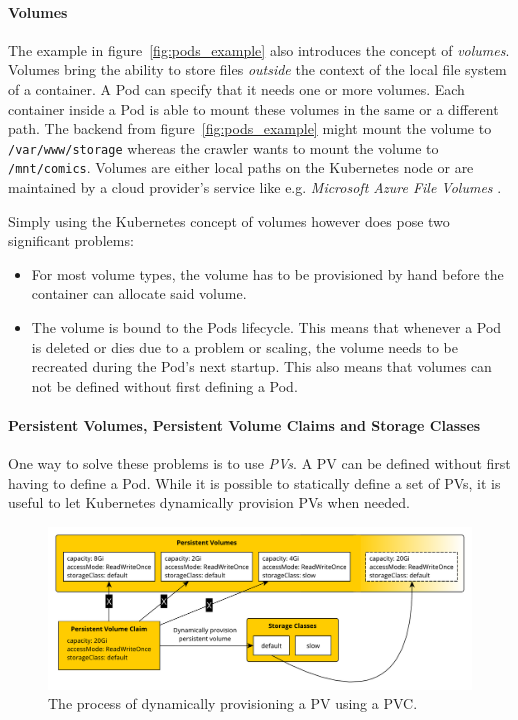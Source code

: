 \paragraph{Volumes}%
\label{par:Volumes}

The example in figure~\ref{fig:pods_example} also introduces the concept of
\textit{volumes}. Volumes bring the ability to store files \textit{outside} the
context of the local file system of a container. A Pod can specify that it
needs one or more volumes. Each container inside a Pod is able to mount these
volumes in the same or a different path. The backend from
figure~\ref{fig:pods_example} might mount the volume to
\texttt{/var/www/storage} whereas the crawler wants to mount the volume to
\texttt{/mnt/comics}. Volumes are either local paths on the Kubernetes node or
are maintained by a cloud provider's service like e.g. \textit{Microsoft Azure
File Volumes} \autocite[Ch. 6]{LuksaKubernetesAction2017}.

Simply using the Kubernetes concept of volumes however does pose two significant problems:
\begin{itemize}
  \item For most volume types, the volume has to be provisioned by hand before
    the container can allocate said volume.
  \item The volume is bound to the Pods lifecycle. This means that whenever a
    Pod is deleted or dies due to a problem or scaling, the volume needs
    to be recreated during the Pod's next startup. This also means that volumes
    can not be defined without first defining a Pod.
\end{itemize}

\paragraph{Persistent Volumes, Persistent Volume Claims and Storage Classes}%
\label{par:Persistent_Volume_Claims_and_Storage_Classes}
One way to solve these problems is to use \textit{\acfp{PV}}. A \ac{PV} can be
defined without first having to define a Pod. While it is possible to
statically define a set of \acp{PV}, it is useful to let Kubernetes dynamically
provision \acp{PV} when needed.

\begin{figure}[H]
\begin{center}
  \includegraphics[scale=0.5]{images/figures/pvs.pdf}
\end{center}
\caption{The process of dynamically provisioning a \acf{PV} using a \acf{PVC}.}%
\label{fig:dynamic_pvs}
\end{figure}

